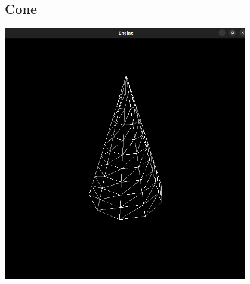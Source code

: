 \subsection{Cone}

\begin{center}
    \includegraphics[width=0.8\textwidth]{imgs/final/cone.png}
    \label{fig:conefinal}
\end{center}